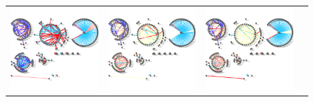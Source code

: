 \documentclass{bioinfo}
\begin{document}
\begin{figure}[htp]
  \centering
  \begin{tabular}{cccc}
  \includegraphics[scale=0.3]{results/aejoint/t1.png}
  &   \includegraphics[scale=0.3]{results/aejoint/t2.png}
  &   \includegraphics[scale=0.3]{results/aejoint/t3.png}

\end{tabular}
\end{figure}
\end{document}
